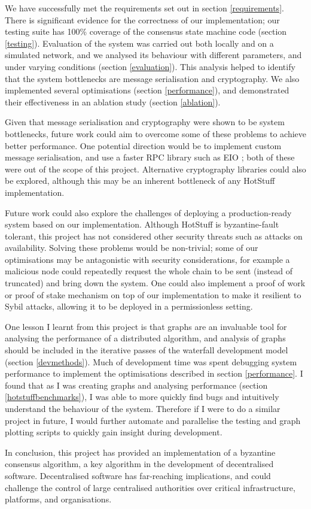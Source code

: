 We have successfully met the requirements set out in section \ref{requirements}. There is significant evidence for the correctness of our implementation; our testing suite has 100\% coverage of the consensus state machine code (section \ref{testing}). Evaluation of the system was carried out both locally and on a simulated network, and we analysed its behaviour with different parameters, and under varying conditions (section \ref{evaluation}). This analysis helped to identify that the system bottlenecks are message serialisation and cryptography. We also implemented several optimisations (section \ref{performance}), and demonstrated their effectiveness in an ablation study (section \ref{ablation}).

Given that message serialisation and cryptography were shown to be system bottlenecks, future work could aim to overcome some of these problems to achieve better performance. One potential direction would be to implement custom message serialisation, and use a faster RPC library such as EIO \cite{eio}; both of these were out of the scope of this project. Alternative cryptography libraries could also be explored, although this may be an inherent bottleneck of any HotStuff implementation.

Future work could also explore the challenges of deploying a production-ready system based on our implementation. Although HotStuff is byzantine-fault tolerant, this project has not considered other security threats such as attacks on availability. Solving these problems would be non-trivial; some of our optimisations may be antagonistic with security considerations, for example a malicious node could repeatedly request the whole chain to be sent (instead of truncated) and bring down the system. One could also implement a proof of work or proof of stake mechanism on top of our implementation to make it resilient to Sybil attacks, allowing it to be deployed in a permissionless setting.

One lesson I learnt from this project is that graphs are an invaluable tool for analysing the performance of a distributed algorithm, and analysis of graphs should be included in the iterative passes of the waterfall development model (section \ref{devmethods}). Much of development time was spent debugging system performance to implement the optimisations described in section \ref{performance}. I found that as I was creating graphs and analysing performance (section \ref{hotstuffbenchmarks}), I was able to more quickly find bugs and intuitively understand the behaviour of the system. Therefore if I were to do a similar project in future, I would further automate and parallelise the testing and graph plotting scripts to quickly gain insight during development.

In conclusion, this project has provided an implementation of a byzantine consensus algorithm, a key algorithm in the development of decentralised software. Decentralised software has far-reaching implications, and could challenge the control of large centralised authorities over critical infrastructure, platforms, and organisations.